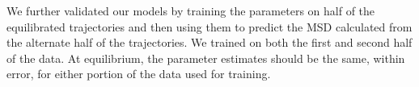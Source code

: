 \documentclass{article}
\begin{document}
  

  We further validated our models by training the parameters on half of the 
  equilibrated trajectories and then using them to predict the MSD calculated
  from the alternate half of the trajectories. We trained on both the first
  and second half of the data. At equilibrium, the parameter estimates should 
  be the same, within error, for either portion of the data used for training.
  
\end{document}
